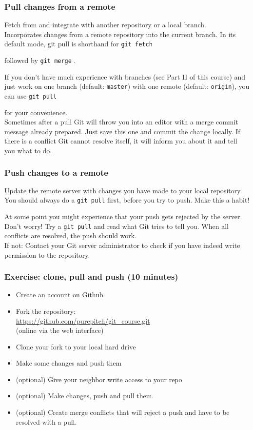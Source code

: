 \documentclass[handout,notes]{gittalk}
\newenvironment{exerciseframe}
{
\setbeamercolor{background canvas}{bg=orange!20}
\begin{frame}
}
{
\end{frame}
}
\newcommand{\hlcommand}[1]{ %
\colorbox{base3}{\small \texttt{#1}}
}
\begin{document}
\begin{frame}[fragile]
\frametitle{Pull changes from a remote}
\begin{tcolorbox}[title=git pull]
Fetch from and integrate with another repository or a local 
branch.\\[0.5em]
Incorporates changes from a remote repository into the current branch. 
In its default mode, git pull is shorthand for \hlcommand{git fetch} 
followed by \hlcommand{git merge}.
\end{tcolorbox}
\vspace*{0.5em}
If you don't have much experience with branches (see Part II of this 
course) and just work on one branch (default: \texttt{master}) with 
one remote (default: \texttt{origin}), you can use \hlcommand{git pull}
for your convenience.\\[0.5em]
Sometimes after a pull Git will throw you into an editor with a merge 
commit message already prepared. Just save this one and commit the 
change locally. If there is a conflict Git cannot resolve itself, it 
will inform you about it and tell you what to do.
\end{frame}

\begin{frame}[fragile]
\frametitle{Push changes to a remote}
\begin{tcolorbox}[title=git push]
Update the remote server with changes you have made to your local 
repository.\\[0.5em]
You should always do a  \hlcommand{git pull} first, before you try to 
push. Make this a habit!
\end{tcolorbox}

At some point you might experience that your push gets rejected by the 
server. Don't worry! Try a \hlcommand{git pull} and read what Git 
tries to tell you. When all conflicts are resolved, the push should 
work.\\[0.5em]
If not: Contact your Git server administrator to check if you have 
indeed write permission to the repository. 

\end{frame}

\begin{exerciseframe}
\frametitle{Exercise: clone, pull and push \hfill (10 minutes)}
\begin{itemize}
  \item Create an account on Github
  \item Fork the repository: \\
  \url{https://github.com/purepitch/git_course.git} \\
  (online via the web interface)
  \item Clone your fork to your local hard drive
  \item Make some changes and push them
  \item (optional) Give your neighbor write access to your repo
  \item (optional) Make changes, push and pull them.
  \item (optional) Create merge conflicts that will reject a push and 
  have to be resolved with a pull.
\end{itemize}
\end{exerciseframe}
\end{document}
